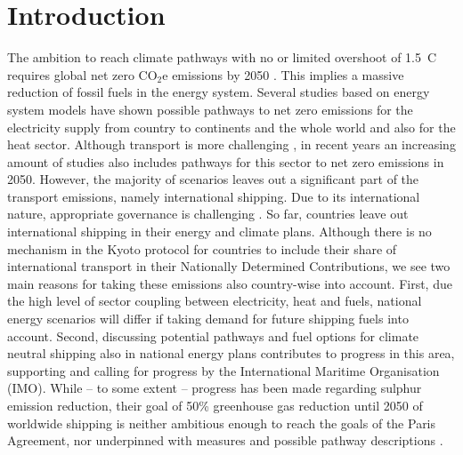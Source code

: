 \documentclass[article]{elsarticle}
\begin{document}

\section{Introduction}

The ambition to reach climate pathways with no or limited overshoot of 1.5~\degree C requires global net zero CO$_2$e emissions by 2050 \cite{IPCC2018}. This implies a massive reduction of fossil fuels in the energy system. Several studies based on energy system models have shown possible pathways to net zero emissions for the electricity supply from country to continents and the whole world \cite{Brown2018} and also for the heat sector. Although transport is more challenging \cite{Salvucci2018,Schafer2012}, in recent years an increasing amount of studies also includes pathways for this sector to net zero emissions in 2050. However, the majority of scenarios leaves out a significant part of the transport emissions, namely international shipping. Due to its international nature, appropriate governance is challenging \cite{GRITSENKO2017}. So far, countries leave out international shipping in their energy and climate plans. Although there is no mechanism in the Kyoto protocol for countries to include their share of international transport in their Nationally Determined Contributions, we see two main reasons for taking these emissions also country-wise into account. First, due the high level of sector coupling between electricity, heat and fuels, national energy scenarios will differ if taking demand for future shipping fuels into account. Second, discussing potential pathways and fuel options for climate neutral shipping also in national energy plans contributes to progress in this area, supporting and calling for progress by the International Maritime Organisation (IMO). While -- to some extent -- progress has been made regarding sulphur emission reduction, their goal of 50\% greenhouse gas reduction until 2050 of worldwide shipping \cite{IMO2018} is neither ambitious enough to reach the goals of the Paris Agreement, nor underpinned with measures and possible pathway descriptions \cite{Wan2018}.
\end{document}
